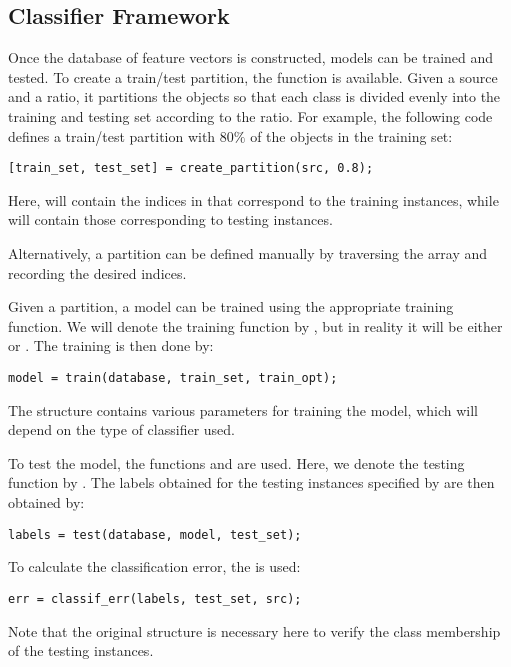 \documentclass[twocolumn]{article}
\begin{document}
\subsection{Classifier Framework}
Once the database of feature vectors is constructed, models can be trained and tested. To create a train/test partition, the function  is available. Given a source  and a ratio, it partitions the objects so that each class is divided evenly into the training and testing set according to the ratio. For example, the following code defines a train/test partition with $80\%$ of the objects in the training set:
\begin{lstlisting}
[train_set, test_set] = create_partition(src, 0.8);
\end{lstlisting}
Here,  will contain the indices in  that correspond to the training instances, while  will contain those corresponding to testing instances.

Alternatively, a partition can be defined manually by traversing the  array and recording the desired indices.

Given a partition, a model can be trained using the appropriate training function. We will denote the training function by , but in reality it will be either  or . The training is then done by:
\begin{lstlisting}
model = train(database, train_set, train_opt);
\end{lstlisting}
The structure  contains various parameters for training the model, which will depend on the type of classifier used.

To test the model, the functions  and  are used. Here, we denote the testing function by . The labels obtained for the testing instances specified by  are then obtained by:
\begin{lstlisting}
labels = test(database, model, test_set);
\end{lstlisting}
To calculate the classification error, the  is used:
\begin{lstlisting}
err = classif_err(labels, test_set, src);
\end{lstlisting}
Note that the original  structure is necessary here to verify the class membership of the testing instances.
\end{document}
